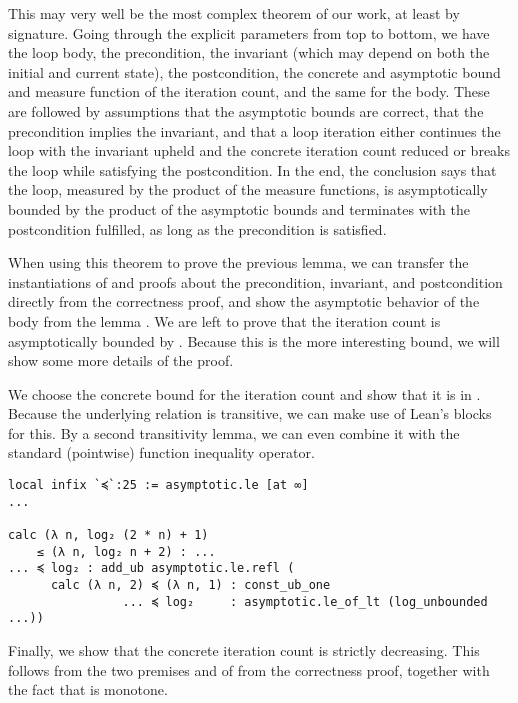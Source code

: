 This may very well be the most complex theorem of our work, at least by
signature. Going through the explicit parameters from top to bottom, we have the
loop body, the precondition, the invariant (which may depend on both the initial
and current state), the postcondition, the concrete and asymptotic bound and
measure function of the iteration count, and the same for the body. These are
followed by assumptions that the asymptotic bounds are correct, that the
precondition implies the invariant, and that a loop iteration either continues
the loop with the invariant upheld and the concrete iteration count reduced or
breaks the loop while satisfying the postcondition. In the end, the conclusion says
that the loop, measured by the product of the measure functions, is
asymptotically bounded by the product of the asymptotic bounds and terminates
with the postcondition fulfilled, as long as the precondition is satisfied.

When using this theorem to prove the previous lemma, we can transfer the
instantiations of and proofs about the precondition, invariant, and
postcondition directly from the correctness proof, and show the asymptotic
behavior of the body from the lemma . We are left to prove
that the iteration count is asymptotically bounded by . Because this
is the more interesting bound, we will show some more details of the proof.

We choose the concrete bound  for the iteration
count and show that it is in . Because the underlying relation
 is transitive, we can make use of Lean's  blocks
for this. By a second transitivity lemma, we can even combine it with the
standard (pointwise) function inequality operator.

\begin{verbatim}
local infix `≼`:25 := asymptotic.le [at ∞]
...

calc (λ n, log₂ (2 * n) + 1)
    ≤ (λ n, log₂ n + 2) : ...
... ≼ log₂ : add_ub asymptotic.le.refl (
      calc (λ n, 2) ≼ (λ n, 1) : const_ub_one
                ... ≼ log₂     : asymptotic.le_of_lt (log_unbounded ...))
\end{verbatim}

Finally, we show that the concrete iteration count is strictly decreasing. This
follows from the two premises  and  of  from the correctness proof, together with the fact
that  is monotone.

